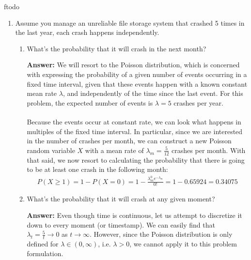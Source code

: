 ƒtodo\documentclass{article}
\newenvironment{QandA}{\begin{enumerate}[label=\arabic*.]}{\end{enumerate}}
\newenvironment{InnerQandA}{\begin{enumerate}[label=\roman*.]}{\end{enumerate}}
\newenvironment{answer}{\par\normalfont \textbf{Answer:}}{}
\begin{document}
\begin{QandA}
    \item Assume you manage an unreliable file storage system that crashed 5 times in the last year, each crash happens independently.
    \begin{InnerQandA}
        \item What's the probability that it will crash in the next month?
        \begin{answer}
            We will resort to the Poisson distribution, which is concerned with expressing the probability of a given number of events occurring in a fixed time interval, given that these events happen with a known constant mean rate $\lambda$, and independently of the time since the last event. For this problem, the expected number of events is $\lambda=5$ crashes per year. \\\\
            Because the events occur at constant rate, we can look what happens in multiples of the fixed time interval. In particular, since we are interested in the number of crashes per month, we can construct a new Poisson random variable $X$ with a mean rate of $\lambda_m = \frac{5}{12}$ crashes per month. With that said, we now resort to calculating the probability that there is going to be at least one crash in the following month:
            \begin{align*}
                P(X \ge 1) = 1 - P(X=0) = 1 - \frac{\lambda_m^0e^{-\lambda_m}}{0!} = 1 - 0.65924 = 0.34075
            \end{align*}
        \end{answer}

        \item What's the probability that it will crash at any given moment?
        \begin{answer}
              Even though time is continuous, let us attempt to discretize it down to every moment (or timestamp). We can easily find that $\lambda_t = \frac{5}{t} \rightarrow 0$ as $t \rightarrow \infty$. However, since the Poisson distribution is only defined for $\lambda \in (0, \infty)$, i.e. $\lambda > 0$, we cannot apply it to this problem formulation. 
        \end{answer}
    \end{InnerQandA}
    

\end{QandA}
\end{document}
